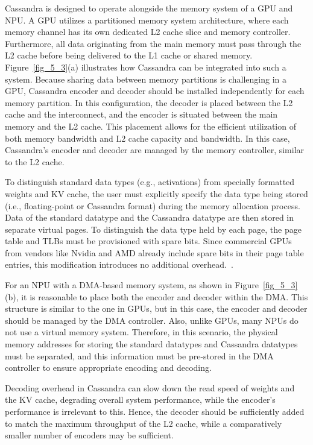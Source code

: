 Cassandra is designed to operate alongside the memory system of a GPU and NPU. A GPU utilizes a partitioned memory system architecture, where each memory channel has its own dedicated L2 cache slice and memory controller. Furthermore, all data originating from the main memory must pass through the L2 cache before being delivered to the L1 cache or shared memory. Figure~\ref{fig_5_3}(a) illustrates how Cassandra can be integrated into such a system. Because sharing data between memory partitions is challenging in a GPU, Cassandra encoder and decoder should be installed independently for each memory partition.
In this configuration, the decoder is placed between the L2 cache and the interconnect, and the encoder is situated between the main memory and the L2 cache. This placement allows for the efficient utilization of both memory bandwidth and L2 cache capacity and bandwidth. In this case, Cassandra's encoder and decoder are managed by the memory controller, similar to the L2 cache.

To distinguish standard data types (e.g., activations) from specially formatted weights and KV cache, the user must explicitly specify the data type being stored (i.e., floating-point or Cassandra format) during the memory allocation process. Data of the standard datatype and the Cassandra datatype are then stored in separate virtual pages. To distinguish the data type held by each page, the page table and TLBs must be provisioned with spare bits. Since commercial GPUs from vendors like Nvidia and AMD already include spare bits in their page table entries, this modification introduces no additional overhead.~\cite{ecco}.

For an NPU with a DMA-based memory system, as shown in Figure~\ref{fig_5_3}(b), it is reasonable to place both the encoder and decoder within the DMA. This structure is similar to the one in GPUs, but in this case, the encoder and decoder should be managed by the DMA controller. Also, unlike GPUs, many NPUs do not use a virtual memory system. Therefore, in this scenario, the physical memory addresses for storing the standard datatypes and Cassandra datatypes must be separated, and this information must be pre-stored in the DMA controller to ensure appropriate encoding and decoding.

Decoding overhead in Cassandra can slow down the read speed of weights and the KV cache, degrading overall system performance, while the encoder's performance is irrelevant to this. Hence, the decoder should be sufficiently added to match the maximum throughput of the L2 cache, while a comparatively smaller number of encoders may be sufficient.

